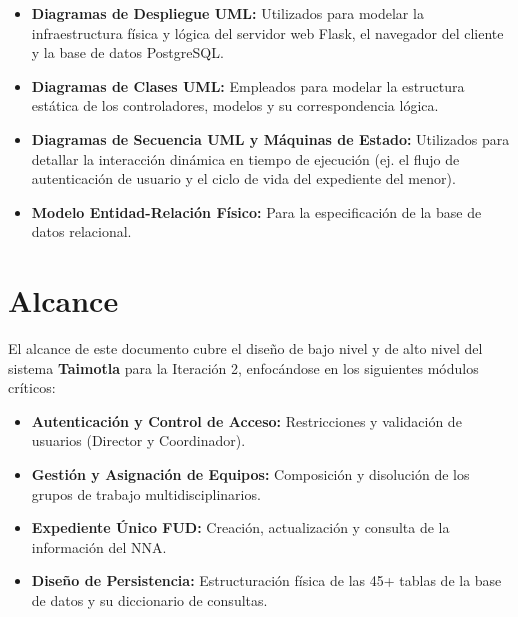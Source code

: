 \begin{itemize}
    \item \textbf{Diagramas de Despliegue UML:} Utilizados para modelar la infraestructura física y lógica del servidor web Flask, el navegador del cliente y la base de datos PostgreSQL.
    \item \textbf{Diagramas de Clases UML:} Empleados para modelar la estructura estática de los controladores, modelos y su correspondencia lógica.
    \item \textbf{Diagramas de Secuencia UML y Máquinas de Estado:} Utilizados para detallar la interacción dinámica en tiempo de ejecución (ej. el flujo de autenticación de usuario y el ciclo de vida del expediente del menor).
    \item \textbf{Modelo Entidad-Relación Físico:} Para la especificación de la base de datos relacional.
\end{itemize}

\section{Alcance}
\label{sec:alcanceDiseno}

El alcance de este documento cubre el diseño de bajo nivel y de alto nivel del sistema \textbf{Taimotla} para la Iteración 2, enfocándose en los siguientes módulos críticos:

\begin{itemize}
    \item \textbf{Autenticación y Control de Acceso:} Restricciones y validación de usuarios (Director y Coordinador).
    \item \textbf{Gestión y Asignación de Equipos:} Composición y disolución de los grupos de trabajo multidisciplinarios.
    \item \textbf{Expediente Único FUD:} Creación, actualización y consulta de la información del NNA.
    \item \textbf{Diseño de Persistencia:} Estructuración física de las 45+ tablas de la base de datos y su diccionario de consultas.
\end{itemize}
